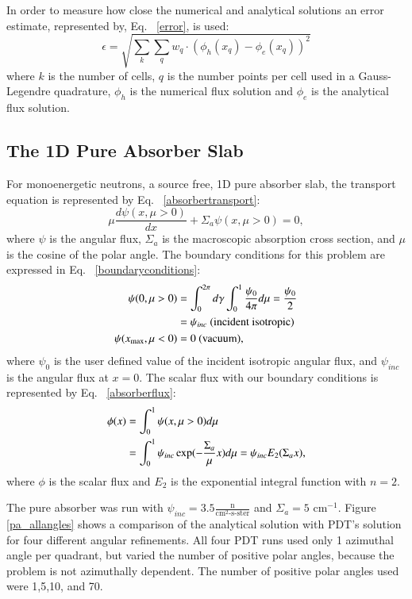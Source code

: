 \documentclass{anstrans}
\newcommand{\norm}[1]{\left\lVert#1\right\rVert}
\begin{document}
In order to measure how close the numerical and analytical solutions an error estimate, represented by, Eq. ~\eqref{error}, is used:
\begin{equation}
\epsilon = \sqrt{\sum_k \sum_q w_q \cdot(\phi_h(x_q) - \phi_e(x_q))^2}
\label{error}
\end{equation}
where $k$ is the number of cells, $q$ is the number points per cell used in a Gauss-Legendre quadrature, $\phi_h$ is the numerical flux solution and $\phi_e$ is the analytical flux solution.

\subsection{The 1D Pure Absorber Slab}

For monoenergetic neutrons, a source free, 1D pure absorber slab, the transport equation is represented by Eq. ~\eqref{absorbertransport}:
\begin{equation}
\mu \frac{d\psi (x,\mu>0)}{dx} + \Sigma_a \psi(x,\mu>0) = 0,
\label{absorbertransport}
\end{equation}
where $\psi$ is the angular flux, $\Sigma_a$ is the macroscopic absorption cross section, and $\mu$ is the cosine of the polar angle. The boundary conditions for this problem are expressed in Eq. ~\eqref{boundaryconditions}:
\begin{align}
\label{boundaryconditions}
\psi(0,\mu>0) &= \int_{0}^{2\pi}d\gamma \int_{0}^{1}\frac{\psi_{0}}{4\pi} d\mu = \frac{\psi_{0}}{2} \notag \\
 &= \psi_{inc} \text{ (incident isotropic)} \notag \\
\psi(x_{\text{max}},\mu<0) &= 0 \text{ (vacuum)},
\end{align}
where $\psi_{0}$ is the user defined value of the incident isotropic angular flux, and $\psi_{inc}$ is the angular flux at $x = 0$. 
The scalar flux with our boundary conditions is represented by Eq. ~\eqref{absorberflux}:
\begin{align}
\phi(x) &= \int_{0}^{1}\psi(x,\mu>0) d\mu \notag \\
&= \int_{0}^{1}\psi_{inc}\exp(-\frac{\Sigma_a}{\mu} x) d\mu = \psi_{inc} E_{2}(\Sigma_a x),
\label{absorberflux}
\end{align}
where $\phi$ is the scalar flux and $E_2$ is the exponential integral function with $n=2$. 

The pure absorber was run with $\psi_{inc} = 3.5 \frac{\text{n}}{\text{cm}^2\text{-s-ster}}$ and $\Sigma_a = 5 \text{ cm}^{-1}$. Figure \ref{pa_allangles} shows a comparison of the analytical solution with PDT's solution for four different angular refinements. All four PDT runs used only 1 azimuthal angle per quadrant, but varied the number of positive polar angles, because the problem is not azimuthally dependent. The number of positive polar angles used were 1,5,10, and 70. 
\end{document}
